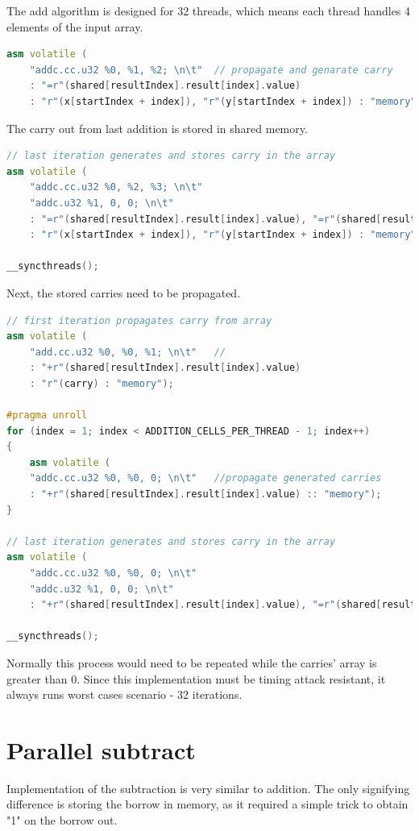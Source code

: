 \documentclass[oneside,openright,12pt,final,en]{mgr}
\begin{document}
The add algorithm is designed for 32 threads, which means each thread handles 4 elements of the input array.

\begin{lstlisting}[language=cpp]
asm volatile (
	"addc.cc.u32 %0, %1, %2; \n\t"	// propagate and genarate carry
	: "=r"(shared[resultIndex].result[index].value)
	: "r"(x[startIndex + index]), "r"(y[startIndex + index]) : "memory");
\end{lstlisting}

The carry out from last addition is stored in shared memory.

\begin{lstlisting}[language=cpp]
// last iteration generates and stores carry in the array
asm volatile (
	"addc.cc.u32 %0, %2, %3; \n\t"
	"addc.u32 %1, 0, 0; \n\t"
	: "=r"(shared[resultIndex].result[index].value), "=r"(shared[resultIndex + 1].carry)
	: "r"(x[startIndex + index]), "r"(y[startIndex + index]) : "memory");

__syncthreads();
\end{lstlisting}

Next, the stored carries need to be propagated.

\begin{lstlisting}[language=cpp]
// first iteration propagates carry from array
asm volatile (
	"add.cc.u32 %0, %0, %1; \n\t"	//  
	: "+r"(shared[resultIndex].result[index].value)
	: "r"(carry) : "memory");

#pragma unroll
for (index = 1; index < ADDITION_CELLS_PER_THREAD - 1; index++)
{
	asm volatile (
	"addc.cc.u32 %0, %0, 0; \n\t"	//propagate generated carries
	: "+r"(shared[resultIndex].result[index].value) :: "memory");
}

// last iteration generates and stores carry in the array
asm volatile (
	"addc.cc.u32 %0, %0, 0; \n\t"
	"addc.u32 %1, 0, 0; \n\t"
	: "+r"(shared[resultIndex].result[index].value), "=r"(shared[resultIndex + 1].carry) :: "memory");

__syncthreads();
\end{lstlisting} 

Normally this process would need to be repeated while the carries' array is greater than 0. Since this implementation must be timing attack resistant, it always runs worst cases scenario - 32 iterations. 

\section{Parallel subtract}
Implementation of the subtraction is very similar to addition. The only signifying difference is storing the borrow in memory, as it required a simple trick to obtain "1" on the borrow out. 
\end{document}
